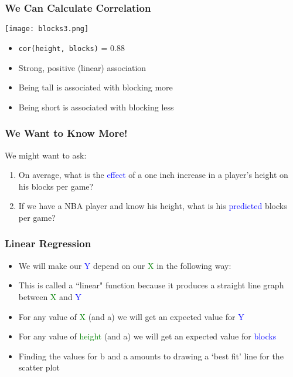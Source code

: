 \documentclass[handout]{beamer}
\newcommand{\blue}{\textcolor{blue}}
\newcommand{\green}{\textcolor{green}}
\begin{document}
\begin{frame}
 \frametitle<+->{We Can Calculate Correlation}
 \begin{minipage}{.48\linewidth}
 \texttt{[image: blocks3.png]}
 \end{minipage}\hfill
 \begin{minipage}{.48\linewidth}
 \begin{itemize}[<+->]
   \item {\tt cor(height, blocks)} = 0.88
   \item Strong, positive (linear) association 
   \item Being tall is associated with blocking more
   \item Being short is associated with blocking less
 \end{itemize}
 \end{minipage}
\end{frame}

\begin{frame}
 \frametitle<+->{We Want to Know More!}
 We might want to ask:
 \begin{enumerate}[<+->]
   \item On average, what is the \blue{effect} of a one inch increase in a player's height on his blocks per game?
   \item If we have a NBA player and know his height, what is his \blue{predicted} blocks per game?
 \end{enumerate}
 \bigskip
 \begin{center}
 \bigskip
  \end{center}
\end{frame}

\begin{frame}
 \frametitle<+->{Linear Regression}
 \begin{itemize}[<+->]
   \item We will make our \blue{Y} depend on our \green{X} in the following way:
   \item This is called a ``linear" function because it produces a straight line graph between \green{X} and \blue{Y}
   \item For any value of \green{X} (and a) we will get an expected value for \blue{Y}
   \item For any value of \green{height} (and a) we will get an expected value for \blue{blocks}
   \item Finding the values for b and a amounts to drawing a `best fit' line for the scatter plot
 \end{itemize}
\end{frame}
\end{document}
